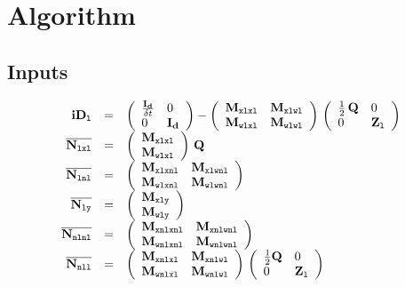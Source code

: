 \documentclass[10pt,a4paper]{article}
\begin{document}
\section{Algorithm}
\subsection{Inputs}
\begin{equation}
\begin{array}{rcl}
\mathbf{iD}_{\mathtt{l}} &=& \left(\begin{array}{ll}
\frac{\mathbf{I_d}}{\delta t}&0 \\ 
0 &\mathbf{I_d}
\end{array}\right)-\left(\begin{array}{ll}
\mathbf{M}_{\mathtt{xlxl}}&\mathbf{M}_{\mathtt{xlwl}} \\ 
\mathbf{M}_{\mathtt{wlxl}}&\mathbf{M}_{\mathtt{wlwl}} 
\end{array}\right)\,\left(\begin{array}{ll}
\frac{1}{2}\,\mathbf{Q}&0 \\ 
0 &\mathbf{Z}_{\mathtt{l}}
\end{array}\right) 
\\
\overline{\mathbf{N}_{\mathtt{lxl}}}
&=&
\left(\begin{array}{ll}
\mathbf{M}_{\mathtt{xlxl}}\\ 
\mathbf{M}_{\mathtt{wlxl}}
\end{array}\right)\,\mathbf{Q}
\\
\overline{\mathbf{N}_{\mathtt{lnl}}}
&=&
\left(\begin{array}{ll}
\mathbf{M}_{\mathtt{xlxnl}} & \mathbf{M}_{\mathtt{xlwnl}}\\ 
\mathbf{M}_{\mathtt{wlxnl}} & \mathbf{M}_{\mathtt{wlwnl}}
\end{array}\right)
\\
\overline{\mathbf{N}_{\mathtt{ly}}}
&=&
\left(\begin{array}{ll}
\mathbf{M}_{\mathtt{xly}}\\ 
\mathbf{M}_{\mathtt{wly}}
\end{array}\right)
\\
\overline{\mathbf{N}_{\mathtt{nlnl}}}
&=&
\left(\begin{array}{ll}
\mathbf{M}_{\mathtt{xnlxnl}}& \mathbf{M}_{\mathtt{xnlwnl}} \\ 
 \mathbf{M}_{\mathtt{wnlxnl}}& \mathbf{M}_{\mathtt{wnlwnl}} 
\end{array}\right)
\\
\overline{\mathbf{N}_{\mathtt{nll}}}
&=&
\left(\begin{array}{ll}
\mathbf{M}_{\mathtt{xnlxl}}& \mathbf{M}_{\mathtt{xnlwl}} \\ 
 \mathbf{M}_{\mathtt{wnlxl}}& \mathbf{M}_{\mathtt{wnlwl}} 
\end{array}\right)
\,
\left(\begin{array}{ll}
\frac{1}{2}\mathbf{Q}	& 0\\ 
0& \mathbf{Z}_{\mathtt{l}}
\end{array}\right)

\end{array}
\end{equation}
\end{document}
